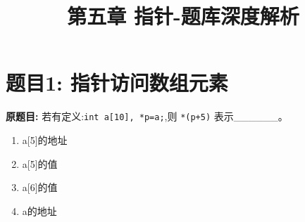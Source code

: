 \documentclass[a4paper,12pt]{article}
\title{\textbf{第五章 指针-题库深度解析}}
\author{}
\date{}
\begin{document}
\maketitle

\tableofcontents
\newpage

\section*{题目1: 指针访问数组元素}

\textbf{原题目:}
若有定义:\texttt{int a[10], *p=a;},则 \texttt{*(p+5)} 表示\_\_\_\_\_\_。
\begin{enumerate}
	\item[A)] a[5]的地址
	\item[B)] a[5]的值
	\item[C)] a[6]的值
	\item[D)] a的地址
\end{enumerate}
\end{document}
